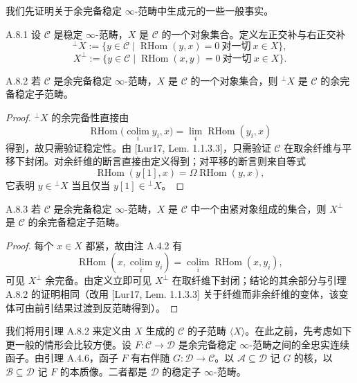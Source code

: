 我们先证明关于余完备稳定 $\infty$-范畴中生成元的一些一般事实。

\begin{defn}{A.8.1}\label{thm:a4-18-2}
设 $\mathcal C$ 是稳定 $\infty$-范畴，$X$ 是 $\mathcal C$ 的一个对象集合。定义左正交补与右正交补
\[
{}^{\perp}X:=\{y\in\mathcal C\mid \operatorname{RHom}(y,x)=0\ \text{对一切}\ x\in X\},
\]
\[
X^{\perp}:=\{y\in\mathcal C\mid \operatorname{RHom}(x,y)=0\ \text{对一切}\ x\in X\}.
\]
\end{defn}

\begin{lem}{A.8.2}\label{thm:a4-18-3}
若 $\mathcal C$ 是余完备稳定 $\infty$-范畴，$X$ 是 $\mathcal C$ 的一个对象集合，则 ${}^{\perp}X$ 是 $\mathcal C$ 的余完备稳定子范畴。
\end{lem}
\begin{proof}
${}^{\perp}X$ 的余完备性直接由
\[
\operatorname{RHom}\bigl(\operatorname*{colim}_i y_i,x\bigr)=\lim_i\operatorname{RHom}(y_i,x)
\]
得到，故只需验证稳定性。由 [Lur17, Lem. 1.1.3.3]，只需验证 $\mathcal C$ 在取余纤维与平移下封闭。对余纤维的断言直接由定义得到；对平移的断言则来自等式
\[
\operatorname{RHom}(y[1],x)=\Omega\operatorname{RHom}(y,x),
\]
它表明 $y\in{}^{\perp}X$ 当且仅当 $y[1]\in{}^{\perp}X$。
\end{proof}

\begin{lem}{A.8.3}\label{thm:a4-18-4}
若 $\mathcal C$ 是余完备稳定 $\infty$-范畴，$X$ 是 $\mathcal C$ 中一个由紧对象组成的集合，则 $X^{\perp}$ 是 $\mathcal C$ 的余完备稳定子范畴。
\end{lem}
\begin{proof}
每个 $x\in X$ 都紧，故由注 A.4.2 有
\[
\operatorname{RHom}(x,\operatorname*{colim}_i y_i)=\operatorname*{colim}_i\operatorname{RHom}(x,y_i),
\]
可见 $X^{\perp}$ 余完备。由定义立即可见 $X^{\perp}$ 在取纤维下封闭；结论的其余部分与引理 A.8.2 的证明相同（改用 [Lur17, Lem. 1.1.3.3] 关于纤维而非余纤维的变体，该变体可由前引结果过渡到反范畴得到）。
\end{proof}

我们将用引理 A.8.2 来定义由 $X$ 生成的 $\mathcal C$ 的子范畴 $\langle X\rangle$。在此之前，先考虑如下更一般的情形会比较方便。设 $F:\mathcal C\to\mathcal D$ 是余完备稳定 $\infty$-范畴之间的全忠实连续函子。由引理 A.4.6，函子 $F$ 有右伴随 $G:\mathcal D\to\mathcal C$。以 $\mathcal A\subseteq\mathcal D$ 记 $G$ 的核，以 $\mathcal B\subseteq\mathcal D$ 记 $F$ 的本质像。二者都是 $\mathcal D$ 的稳定子 $\infty$-范畴。

